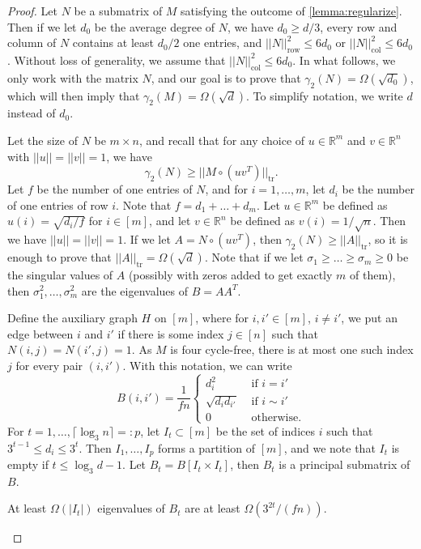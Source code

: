 \documentclass[10pt,a4paper]{amsart}
\DeclareMathOperator{\col}{col}
\DeclareMathOperator{\row}{row}
\DeclareMathOperator{\tr}{tr}
\begin{document}
\begin{proof}
Let $N$ be a submatrix of $M$ satisfying the outcome of \cref{lemma:regularize}. Then if we let $d_0$ be the average degree of $N$, we have $d_0\geq d/3$, every row and column of $N$ contains at least $d_0/2$ one entries, and $||N||_{\row}^2\leq 6d_0$ or $||N||_{\col}^2\leq 6d_0$. Without loss of generality, we assume that $||N||_{\col}^2\leq 6d_0$. In what follows, we only work with the matrix $N$, and our goal is to prove that $\gamma_2(N)=\Omega(\sqrt{d_0})$, which will then imply that $\gamma_2(M)=\Omega(\sqrt{d})$. To simplify notation, we write $d$ instead of $d_0$.

Let the size of $N$ be $m\times n$, and recall that for any choice of $u\in \mathbb{R}^m$ and $v\in \mathbb{R}^n$ with $||u||=||v||=1$, we have
$$\gamma_2(N)\geq ||M\circ (uv^T)||_{\tr}.$$
Let $f$ be the number of one entries of $N$, and for $i=1,\dots,m$, let $d_i$ be the number of one entries of row $i$. Note that $f=d_1+\dots+d_m$. Let $u\in \mathbb{R}^m$ be defined as $u(i)=\sqrt{d_i/f}$ for $i\in [m]$, and let $v\in \mathbb{R}^n$ be defined as $v(i)=1/\sqrt{n}$. Then we have $||u||=||v||=1$. If we let $A=N\circ (uv^T)$, then $\gamma_2(N)\geq ||A||_{\tr}$, so it is enough to prove that $||A||_{\tr}=\Omega(\sqrt{d})$. Note that if we let $\sigma_1\geq \dots\geq \sigma_m\geq 0$ be the singular values of $A$ (possibly with zeros added to get exactly $m$ of them), then $\sigma_1^2,\dots,\sigma_m^2$ are the eigenvalues of $B=AA^T$. 

Define the auxiliary graph $H$ on $[m]$, where for $i,i'\in [m]$, $i\neq i'$, we put an edge between $i$ and $i'$ if there is some index $j\in [n]$ such that $N(i,j)=N(i',j)=1$. As $M$ is four cycle-free, there is at most one such index $j$ for every pair $(i,i')$. With this notation, we can write
$$B(i,i')=\frac{1}{fn}\begin{cases} d_i^2 &\mbox{ if }i=i'\\
                        \sqrt{d_id_{i'}} &\mbox{ if }i\sim i'\\
                        0 &\mbox{ otherwise.}\end{cases}$$
For $t=1,\dots,\lceil\log_3 n\rceil=:p$, let $I_t\subset [m]$ be the set of indices $i$ such that $3^{t-1}\leq d_i\leq 3^t$. Then $I_1,\dots,I_p$ forms a partition of $[m]$, and we note that $I_t$ is empty if $t\leq \log_3 d-1$. Let $B_t=B[I_t\times I_t]$, then $B_t$ is a principal submatrix of $B$.

\begin{claim}
At least $\Omega(|I_t|)$ eigenvalues of $B_t$ are at least $\Omega(3^{2t}/(fn))$. 
\end{claim}


\end{proof}
\end{document}
